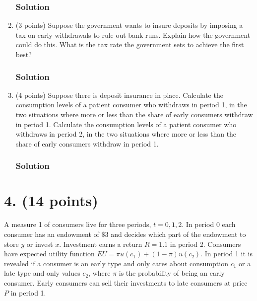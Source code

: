 \documentclass[12pt]{article}
\begin{document}
\begin{enumerate}[label=(\alph*)]
\subsubsection*{Solution}



    \item (3 points) Suppose the government wants to insure deposits by imposing a tax on early withdrawals to rule out bank runs. Explain how the government could do this. What is the tax rate the government sets to achieve the first best?
\subsubsection*{Solution}



    \item (4 points) Suppose there is deposit insurance in place. Calculate the consumption levels of a patient consumer who withdraws in period 1, in the two situations where more or less than the share of early consumers withdraw in period 1. Calculate the consumption levels of a patient consumer who withdraws in period 2, in the two situations where more or less than the share of early consumers withdraw in period 1.
    \subsubsection*{Solution}

    
\end{enumerate}

\section*{4. (14 points)}

A measure 1 of consumers live for three periods, $t = 0, 1, 2$. In period 0 each consumer has an endowment of \$3 and decides which part of the endowment to store $y$ or invest $x$. Investment earns a return $R = 1.1$ in period 2. Consumers have expected utility function $EU = \pi u(c_1)+(1-\pi)u(c_2)$. In period 1 it is revealed if a consumer is an early type and only cares about consumption $c_1$ or a late type and only values $c_2$, where $\pi$ is the probability of being an early consumer. Early consumers can sell their investments to late consumers at price $P$ in period 1.
\end{document}
